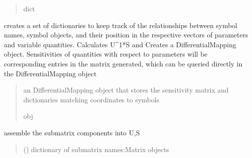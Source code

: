 \documentclass[letterpaper,10pt,english]{sphinxmanual}
\begin{document}
\begin{fulllineitems}
\begin{fulllineitems}
\begin{quote}
\begin{description}
\sphinxAtStartPar
dict

\end{description}\end{quote}

\end{fulllineitems}


\begin{fulllineitems}
\label{\detokenize{src.sensitivity.sensitivity_tools:src.sensitivity.sensitivity_tools.SensitivityMatrix.get_sensitivities}}
\pysigstartsignatures
\pysiglinewithargsret
{}
{}
{}
\pysigstopsignatures
\sphinxAtStartPar
creates a set of dictionaries to keep track of the relationships between symbol names, symbol objects,
and their position in the respective vectors of parameters and variable quantities. Calculates U\textasciicircum{}\sphinxhyphen{}1*S and Creates a DifferentialMapping object.
Sensitivities of quantities with respect to parameters will be corresponding entries in the matrix generated,
which can be queried directly in the DifferentialMapping object
\begin{quote}\begin{description}
\sphinxAtStartPar
an DifferentialMapping object that stores the sensitivity matrix and dictionaries matching coordinates to symbols

\sphinxAtStartPar
obj

\end{description}\end{quote}

\end{fulllineitems}


\begin{fulllineitems}
\label{\detokenize{src.sensitivity.sensitivity_tools:src.sensitivity.sensitivity_tools.SensitivityMatrix.matrix_assembly}}
\pysigstartsignatures
\pysiglinewithargsret
{}
{}
{}
\pysigstopsignatures
\sphinxAtStartPar
assemble the submatrix components into U,S
\begin{quote}\begin{description}
\sphinxAtStartPar
{} () \textendash{} dictionary of submatrix names:Matrix objects


\end{description}
\end{quote}
\end{fulllineitems}
\end{fulllineitems}
\end{document}
